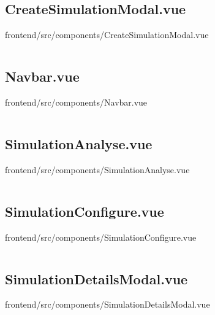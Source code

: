 \inputminted[linenos,breaklines,tabsize=2]{vue}{/Users/Henry/Desktop/NEAComputerScience/frontend/src/components/AppToast.vue}

\makeatletter
\subsection*{CreateSimulationModal.vue}
frontend/src/components/CreateSimulationModal.vue
\def\@currentlabelname{CreateSimulationModal.vue}
\label{code:frontend:src:components:CreateSimulationModal.vue}
\makeatother

\inputminted[linenos,breaklines,tabsize=2]{vue}{/Users/Henry/Desktop/NEAComputerScience/frontend/src/components/CreateSimulationModal.vue}

\makeatletter
\subsection*{Navbar.vue}
frontend/src/components/Navbar.vue
\def\@currentlabelname{Navbar.vue}
\label{code:frontend:src:components:Navbar.vue}
\makeatother

\inputminted[linenos,breaklines,tabsize=2]{vue}{/Users/Henry/Desktop/NEAComputerScience/frontend/src/components/Navbar.vue}

\makeatletter
\subsection*{SimulationAnalyse.vue}
frontend/src/components/SimulationAnalyse.vue
\def\@currentlabelname{SimulationAnalyse.vue}
\label{code:frontend:src:components:SimulationAnalyse.vue}
\makeatother

\inputminted[linenos,breaklines,tabsize=2]{vue}{/Users/Henry/Desktop/NEAComputerScience/frontend/src/components/SimulationAnalyse.vue}

\makeatletter
\subsection*{SimulationConfigure.vue}
frontend/src/components/SimulationConfigure.vue
\def\@currentlabelname{SimulationConfigure.vue}
\label{code:frontend:src:components:SimulationConfigure.vue}
\makeatother

\inputminted[linenos,breaklines,tabsize=2]{vue}{/Users/Henry/Desktop/NEAComputerScience/frontend/src/components/SimulationConfigure.vue}

\makeatletter
\subsection*{SimulationDetailsModal.vue}
frontend/src/components/SimulationDetailsModal.vue
\def\@currentlabelname{SimulationDetailsModal.vue}
\label{code:frontend:src:components:SimulationDetailsModal.vue}
\makeatother

